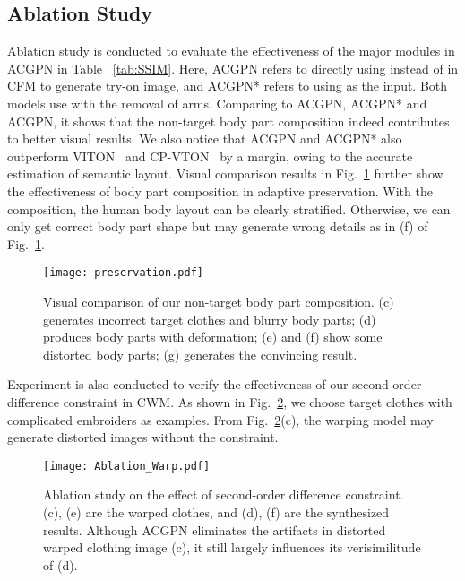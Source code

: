 \documentclass[10pt,twocolumn,letterpaper]{article}
\begin{document}
\subsection{Ablation Study}

Ablation study is conducted to evaluate the effectiveness of the major modules in ACGPN in Table ~\ref{tab:SSIM}.
Here, ACGPN refers to directly using  instead of  in CFM to generate try-on image, and ACGPN* refers to using  as the input. Both models use  with the removal of arms. Comparing to ACGPN, ACGPN* and ACGPN, it shows that the non-target body part composition indeed contributes to better visual results.
We also notice that ACGPN and ACGPN* also outperform VITON~\cite{DBLP:conf/cvpr/HanWWYD18} and CP-VTON~\cite{DBLP:conf/eccv/WangZLCLY18} by a margin, owing to the accurate estimation of semantic layout.
Visual comparison results in Fig.~\ref{fig:preservation} further show the effectiveness of body part composition in adaptive preservation.
With the composition, the human body layout can be clearly stratified. Otherwise, we can only get correct body part shape but may generate wrong details as in (f) of Fig.~\ref{fig:preservation}.


\begin{figure}[htb]
\begin{center}
\vspace{-5pt}
\texttt{[image: preservation.pdf]}
\vspace{-10pt}
\end{center}
   \caption{\footnotesize Visual comparison of our non-target body part composition. (c) generates incorrect target clothes and blurry body parts; (d) produces body parts with deformation; (e) and (f) show some distorted body parts; (g) generates the convincing result.}
\label{fig:preservation}
\vspace{-10pt}
\end{figure}



Experiment is also conducted to verify the effectiveness of our second-order difference constraint in CWM. As shown in Fig.~\ref{fig:AblationWarp}, we choose target clothes with complicated embroiders as examples.
From Fig.~\ref{fig:AblationWarp}(c), the warping model may generate distorted images without the constraint.

 
\begin{figure}[htb]
\begin{center}
\texttt{[image: Ablation\_Warp.pdf]}
\vspace{-10pt}
\end{center}
   \caption{\footnotesize Ablation study on the effect of second-order difference constraint. (c), (e) are the warped clothes, and (d), (f) are the synthesized results. Although ACGPN eliminates the artifacts in distorted warped clothing  image (c), it still largely influences its verisimilitude of (d). }
\label{fig:AblationWarp}
\vspace{-10pt}

\end{figure}
\end{document}
